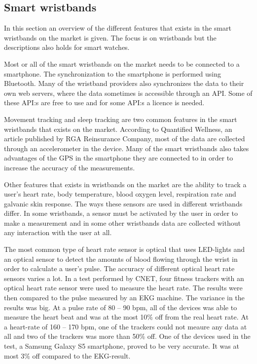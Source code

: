 \documentclass{cslthse-msc}
\begin{document}
\subsection{Smart wristbands}
\label{sec:Wearable}
In this section an overview of the different features that exists in the smart wristbands on the market is given. The focus is on wristbands but the descriptions also holds for smart watches.

Most or all of the smart wristbands on the market needs to be connected to a smartphone. The synchronization to the smartphone is performed using Bluetooth. Many of the wristband providers also synchronizes the data to their own web servers, where the data sometimes is accessible through an API. Some of these API:s are free to use and for some API:s a licence is needed.

Movement tracking and sleep tracking are two common features in the smart wristbands that exists on the market. According to Quantified Wellness, an article published by RGA Reinsurance Company\cite{callaway2015quantified}, most of the data are collected through an accelerometer in the device. Many of the smart wristbands also takes advantages of the GPS in the smartphone they are connected to in order to increase the accuracy of the measurements.

Other features that exists in wristbands on the market are the ability to track a user's heart rate, body temperature, blood oxygen level, respiration rate and galvanic skin response. The ways these sensors are used in different wristbands differ. In some wristbands, a sensor must be activated by the user in order to make a measurement and in some other wristbands data are collected without any interaction with the user at all.

The most common type of heart rate sensor is optical that uses LED-lights and an optical sensor to detect the amounts of blood flowing through the wrist in order to calculate a user’s pulse. The accuracy of different optical heart rate sensors varies a lot. In a test performed by CNET, four fitness trackers with an optical heart rate sensor were used to measure the heart rate. The results were then compared to the pulse measured by an EKG machine. The variance in the results was big.  At a pulse rate of 80 – 90 bpm, all of the devices was able to measure the heart beat and was at the most 10\% off from the real heart rate. At a heart-rate of 160 – 170 bpm, one of the trackers could not meaure any data at all and two of the trackers was more than 50\% off\cite{CNET}. One of the devices used in the test, a Samsung Galaxy S5 smartphone, proved to be very accurate. It was at most 3\% off compared to the EKG-result.
\end{document}

